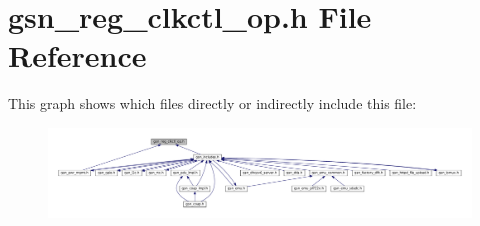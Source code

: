 \hypertarget{a00544}{
\section{gsn\_\-reg\_\-clkctl\_\-op.h File Reference}
\label{a00544}
}
This graph shows which files directly or indirectly include this file:
\nopagebreak
\begin{figure}[H]
\begin{center}
\leavevmode
\includegraphics[width=400pt]{a00783}
\end{center}
\end{figure}
